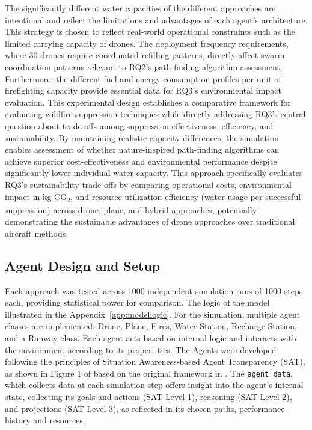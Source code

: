 \documentclass[11pt, a4paper]{article}
\begin{document}
The significantly different water capacities of the different approaches are intentional and reflect the limitations and advantages of each agent's architecture. This strategy is chosen to reflect real-world operational constraints such as the limited carrying capacity of drones.
 The deployment frequency requirements, where 30 drones require coordinated refilling patterns, directly affect swarm coordination patterns relevant to RQ2's path-finding algorithm assessment. Furthermore, the different fuel and energy consumption profiles per unit of firefighting capacity provide essential data for RQ3's environmental impact evaluation.
 This experimental design establishes a comparative framework for evaluating wildfire suppression techniques while directly addressing RQ3's central question about trade-offs among suppression effectiveness, efficiency, and sustainability. By maintaining realistic capacity differences, the simulation enables assessment of whether nature-inspired path-finding algorithms can achieve superior cost-effectiveness and environmental performance despite significantly lower individual water capacity. This approach specifically evaluates RQ3's sustainability trade-offs by comparing operational costs, environmental impact in kg CO\textsubscript{2}, and resource utilization efficiency (water usage per successful suppression) across drone, plane, and hybrid approaches, potentially demonstrating the sustainable advantages of drone approaches over traditional aircraft methods.


\subsection{Agent Design and Setup}

Each approach was tested across 1000 independent simulation runs of 1000 steps each, providing statistical power for comparison. The logic of the model illustrated in the Appendix~\ref{app:modellogic}.
For the simulation, multiple agent classes are implemented: Drone, Plane, Fires, Water Station, Recharge Station, and a Runway class. Each agent acts based on internal logic and interacts with the environment according to its proper-
ties. The Agents were developed following the principles of Situation Awareness-based
Agent Transparency (SAT), as shown in Figure 1 of \citep{chenSituationAwarenessbasedAgent2018} based on the
original framework in \citet*{SAT_first}. The \texttt{agent\_data}, which collects data at each simulation step offers insight into the agent’s internal state, collecting its goals and actions (SAT Level 1), reasoning (SAT Level 2), and projections (SAT Level 3), as reflected in its chosen paths, performance history and resources.
\end{document}
